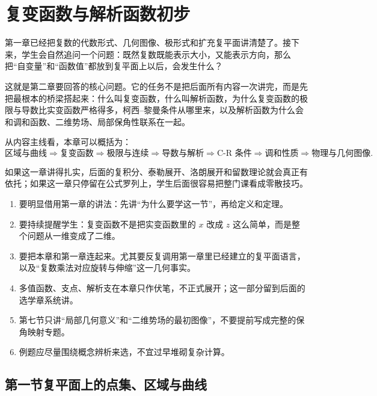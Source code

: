 
\chapter{复变函数与解析函数初步}

\begin{wulibj}[本章定位]
第一章已经把复数的代数形式、几何图像、极形式和扩充复平面讲清楚了。接下来，学生会自然追问一个问题：既然复数既能表示大小，又能表示方向，那么把``自变量''和``函数值''都放到复平面上以后，会发生什么？

这就是第二章要回答的核心问题。它的任务不是把后面所有内容一次讲完，而是先把最根本的桥梁搭起来：什么叫复变函数，什么叫解析函数，为什么复变函数的极限与导数比实变函数严格得多，柯西--黎曼条件从哪里来，以及解析函数为什么会和调和函数、二维势场、局部保角性联系在一起。

从内容主线看，本章可以概括为：
\[
    \text{区域与曲线} \Longrightarrow \text{复变函数} \Longrightarrow \text{极限与连续} \Longrightarrow \text{导数与解析} \Longrightarrow \text{C-R 条件} \Longrightarrow \text{调和性质} \Longrightarrow \text{物理与几何图像}.
\]

如果这一章讲得扎实，后面的复积分、泰勒展开、洛朗展开和留数理论就会真正有依托；如果这一章只停留在公式罗列上，学生后面很容易把整门课看成零散技巧。
\end{wulibj}

\begin{tishi}[写作总原则]
\begin{enumerate}
    \item 要明显借用第一章的讲法：先讲``为什么要学这一节''，再给定义和定理。
    \item 要持续提醒学生：复变函数不是把实变函数里的 $x$ 改成 $z$ 这么简单，而是整个问题从一维变成了二维。
    \item 要把本章和第一章连起来。尤其要反复调用第一章里已经建立的复平面语言，以及``复数乘法对应旋转与伸缩''这一几何事实。
    \item 多值函数、支点、解析支在本章只作伏笔，不正式展开；这一部分留到后面的选学章系统讲。
    \item 第七节只讲``局部几何意义''和``二维势场的最初图像''，不要提前写成完整的保角映射专题。
    \item 例题应尽量围绕概念辨析来选，不宜过早堆砌复杂计算。
\end{enumerate}
\end{tishi}

\section{第一节\quad 复平面上的点集、区域与曲线}

